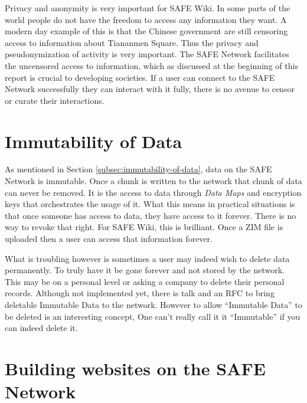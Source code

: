 Privacy and anonymity is very important for SAFE Wiki. In some parts of the world people do not have the freedom to access any information they want. A modern day example of this is that the Chinese government are still censoring access to information about Tiananmen Square\cite{tiananmen-square}. Thus the privacy and pseudonymization of activity is very important. The SAFE Network facilitates the uncensored access to information, which as discussed at the beginning of this report is crucial to developing societies. If a user can connect to the SAFE Network successfully they can interact with it fully, there is no avenue to censor or curate their interactions.

\section{Immutability of Data}

As mentioned in Section \ref{subsec:immutability-of-data}, data on the SAFE Network is immutable. Once a chunk is written to the network that chunk of data can never be removed. It is the access to data through \textit{Data Maps} and encryption keys that orchestrates the usage of it. What this means in practical situations is that once someone has access to data, they have access to it forever. There is no way to revoke that right. For SAFE Wiki, this is brilliant. Once a ZIM file is uploaded then a user can access that information forever.

What is troubling however is sometimes a user may indeed wish to delete data permanently. To truly have it be gone forever and not stored by the network. This may be on a personal level or asking a company to delete their personal records. Although not implemented yet, there is talk and an RFC\cite{delete-data-rfc} to bring deletable Immutable Data to the network. However to allow ``Immutable Data'' to be deleted is an interesting concept, One can't really call it it ``Immutable'' if you can indeed delete it.

\section{Building websites on the SAFE Network}

